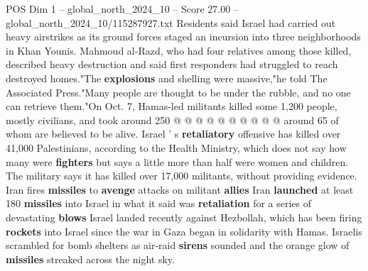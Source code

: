 \begin{textsample}{POS Dim 1 – global\_north\_2024\_10 – Score 27.00 – global\_north\_2024\_10/115287927.txt}
Residents said Israel had carried out heavy airstrikes as its ground forces staged an incursion into three neighborhoods in Khan Younis.
Mahmoud al-Razd, who had four relatives among those killed, described heavy destruction and said first responders had struggled to reach destroyed homes."The \textbf{explosions} and shelling were massive,"he told The Associated Press."Many people are thought to be under the rubble, and no one can retrieve them."On Oct. 7, Hamas-led militants killed some 1,200 people, mostly civilians, and took around 250 @ @ @ @ @ @ @ @ @ @ around 65 of whom are believed to be alive.
Israel ' s \textbf{retaliatory} offensive has killed over 41,000 Palestinians, according to the Health Ministry, which does not say how many were \textbf{fighters} but says a little more than half were women and children.
The military says it has killed over 17,000 militants, without providing evidence.
Iran fires \textbf{missiles} to \textbf{avenge} attacks on militant \textbf{allies} Iran \textbf{launched} at least 180 \textbf{missiles} into Israel in what it said was \textbf{retaliation} for a series of devastating \textbf{blows} Israel landed recently against Hezbollah, which has been firing \textbf{rockets} into Israel since the war in Gaza began in solidarity with Hamas.
Israelis scrambled for bomb shelters as air-raid \textbf{sirens} sounded and the orange glow of \textbf{missiles} streaked across the night sky.

\end{textsample}
